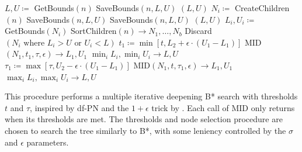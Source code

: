 \begin{algorithm}[p]
\begin{algorithmic}[1]
\State $L,U \coloneqq$ GetBounds$\left(n\right)$
 \label{lst:MIDstopConditionList1}
    \State SaveBounds$\left(n,L,U\right)$
    \State \Return $\left(L, U\right)$
\EndIf
\State $N_i \coloneqq$ CreateChildren$\left(n\right)$
\State SaveBounds$\left(n,L,U\right)$ 
     \label{lst:MIDstopConditionList2}
        \State SaveBounds$\left(n,L,U\right)$
        \State \Return $\left(L, U\right)$
    \EndIf
    \State $L_i,U_i \coloneqq$ GetBounds$\left(N_i\right)$
    \State SortChildren$\left(n\right)\to N_1,\dots,N_b$
    \State Discard$\left(N_i\text{ where }L_i > U \text{ or } U_i < L\right)$
        \State $t_1 \coloneqq \min\left[t,L_2+\epsilon\cdot\left(U_1-L_1\right)\right]$
        \State MID$\left(N_1,t_1,\tau,\epsilon\right)\to L_1,U_1$
        \State $\min_i L_i, \min_i U_i \to L, U$\label{lst:MIDupdateBoundsMin}
        \State $\tau_1\coloneqq\max\left[\tau,U_2-\epsilon\cdot\left(U_1-L_1\right)\right]$
        \State MID$\left(N_1,t,\tau_1,\epsilon\right)\to L_1,U_1$
        \State $\max_i L_i, \max_i U_i \to L, U$\label{lst:MIDupdateBoundsMax}
    \EndIf
\EndWhile
\end{algorithmic}
\caption{MID$\left(n,t,\tau,\epsilon\right)\to\left(L',U'\right)$}
This procedure performs a multiple iterative deepening B* \cite{Berliner1979} search with thresholds $t$ and $\tau$, inspired by df-PN \cite{Nagai2002} and the $1+\epsilon$ trick by . Each call of MID only returns when its thresholds are met. The thresholds and node selection procedure are chosen to search the tree similarly to B*, with some leniency controlled by the $\sigma$ and $\epsilon$ parameters.
\label{alg:MIDdfBstar}
\end{algorithm}

